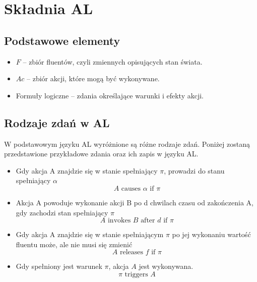 \documentclass{article}
\begin{document}
\section{Składnia AL}

\subsection{Podstawowe elementy}
\begin{itemize}
    \item $F$ – zbiór fluentów, czyli zmiennych opisujących stan świata.
    \item $Ac$ – zbiór akcji, które mogą być wykonywane.
    \item Formuły logiczne – zdania określające warunki i efekty akcji.
\end{itemize}

\subsection{Rodzaje zdań w AL}

W podstawowym języku AL wyróżnione są różne rodzaje zdań. Poniżej zostaną przedstawione przykładowe zdania oraz ich zapis w języku AL.
\begin{itemize}
    \item Gdy akcja A znajdzie się w stanie spełniający $\pi$, prowadzi do stanu spełniający $\alpha$
    \begin{equation}
     A \text{ causes } \alpha \text{ if } \pi
    \end{equation}

    \item Akcja A powoduje wykonanie akcji B po d chwilach czasu od zakończenia A, gdy zachodzi stan spełniający $\pi$
    \begin{equation}
        A \text{ invokes } B \text{ after } d \text{ if } \pi
    \end{equation}

    \item Gdy akcja A znajdzie się w stanie spełniającym $\pi$ po jej wykonaniu wartość fluentu może, ale nie musi się zmienić
    \begin{equation}
        A \text{ releases } f \text{ if } \pi
    \end{equation}

    \item Gdy spełniony jest warunek $\pi$, akcja $A$ jest wykonywana.
    \begin{equation}
        \pi \text{ triggers } A
    \end{equation}
\end{itemize}
\end{document}
